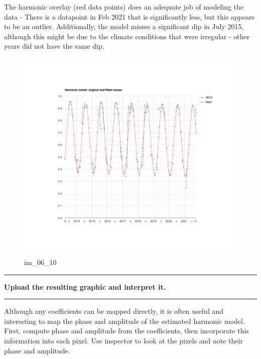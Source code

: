 \documentclass[
]{article}
\begin{document}
The harmonic overlay (red data points) does an adequate job of modeling the data - There is a datapoint in Feb 2021 that is significantly less, but this appears to be an outlier. Additionally, the model misses a significant dip in July 2015, although this might be due to the climate conditions that were irregular - other years did not have the same dip.

\begin{figure}
\centering
\includegraphics{./im/im_06_05.png}
\caption{im\_06\_10}
\end{figure}

\begin{center}\rule{0.5\linewidth}{0.5pt}\end{center}

\textbf{Upload the resulting graphic and interpret it. }

\begin{center}\rule{0.5\linewidth}{0.5pt}\end{center}

Although any coefficients can be mapped directly, it is often useful and interesting to map the phase and amplitude of the estimated harmonic model. First, compute phase and amplitude from the coefficients, then incorporate this information into each pixel. Use inspector to look at the pixels and note their phase and amplitude.
\end{document}
